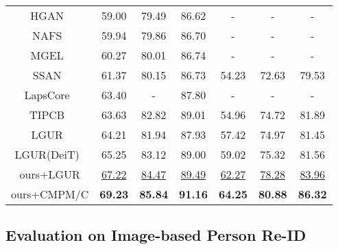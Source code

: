 \documentclass[10pt,twocolumn,letterpaper]{article}
\begin{document}
\begin{table}[t]
{\begin{tabular}{c|ccc|ccc}
\multicolumn{1}{c|}{HGAN~\cite{HGAN}} &59.00& 79.49& 86.62&-&-&-\\

\multicolumn{1}{c|}{NAFS~\cite{NAFS}} &59.94& 79.86& 86.70&-&-&-\\

\multicolumn{1}{c|}{MGEL~\cite{MGEL}} &60.27 &80.01 &86.74&-&-&-\\

\multicolumn{1}{c|}{SSAN~\cite{SSAN}} &61.37 &80.15 &86.73&54.23&72.63&79.53\\

\multicolumn{1}{c|}{LapsCore~\cite{Lapscore}} &63.40 &- &87.80&-&-&-\\

\multicolumn{1}{c|}{TIPCB~\cite{tipcb}} &63.63& 82.82& 89.01&54.96 &74.72 &81.89\\ 

\multicolumn{1}{c|}{LGUR~\cite{LGUR}} &64.21 &81.94 &87.93&57.42 &74.97 &81.45\\ 

\multicolumn{1}{c|}{LGUR(DeiT)~\cite{LGUR}} &65.25 &83.12 &89.00&59.02 &75.32 &81.56\\ 
\hline

\multicolumn{1}{c|}{ours+LGUR} & \underline{67.22}  &\underline{84.47}  &\underline{89.49}	&\underline{62.27} & \underline{78.28}  &\underline{83.96}\\

\multicolumn{1}{c|}{ours+CMPM/C} &\textbf{69.23}  &\textbf{85.84}  &\textbf{91.16}	&\textbf{64.25} &\textbf{80.88}&  \textbf{86.32}\\
\hline
\end{tabular}}
\end{table}

\subsection{Evaluation on Image-based Person Re-ID}
\end{document}
